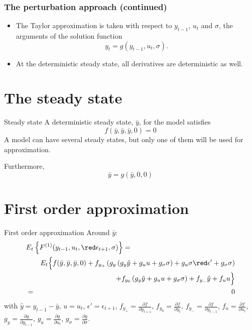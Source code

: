 \documentclass{beamer}
\begin{document}
\begin{frame} \frametitle{The perturbation approach (continued)}
\begin{itemize}
  \item The Taylor approximation is taken with respect to $y_{t-1}$, $u_t$ and $\sigma$, the arguments of the solution function
    \[
    y_t = g(y_{t-1},u_t,\sigma).
    \]
  \item At the deterministic steady state, all derivatives are deterministic as well.
  \end{itemize}
\end{frame}

\section[The steady state]{The steady state}
\begin{slide}{Steady state}
A deterministic steady state, $\bar y$, for the model satisfies
\[
f(\bar y, \bar y, \bar y, 0) = 0
\]
A model can have several steady states, but only one of them will be used for approximation.

Furthermore,
\[
\bar y = g(\bar y, 0, 0)
\]
\end{slide}


\section[First order approximation]{First order approximation}
\begin{slide}{First order approximation}
Around $\bar y$:
\begin{eqnarray*}
   \lefteqn{E_t\left\{F^{(1)}(y_{t-1},u_t,{\red \epsilon_{t+1}},\sigma)\right\} =}\\
&& E_t\Big\{f(\bar y, \bar y, \bar y, 0)+f_{y_+}\left(g_y\left(g_y\hat y+g_uu+g_\sigma\sigma\right)+g_u\sigma{\red \epsilon'}+g_\sigma\sigma\right)\\
&& + f_{y_0}\left(g_y\hat y+g_uu+g_\sigma\sigma\right)+f_{y_-}\hat y+f_u u\Big\}\\
&=& 0
\end{eqnarray*}
with $\hat y = y_{t-1} - \bar y$, $u=u_t$, $\epsilon'=\epsilon_{t+1}$, $f_{y_+}=\frac{\partial f}{\partial y_{t+1}}$, $f_{y_0}=\frac{\partial f}{\partial y_t}$, $f_{y_-}=\frac{\partial f}{\partial y_{t-1}}$, $f_{u}=\frac{\partial f}{\partial u_t}$, $g_y=\frac{\partial g}{\partial y_{t-1}}$, $g_u=\frac{\partial g}{\partial u_t}$, $g_\sigma=\frac{\partial g}{\partial \sigma}$.
\end{slide}
\end{document}
